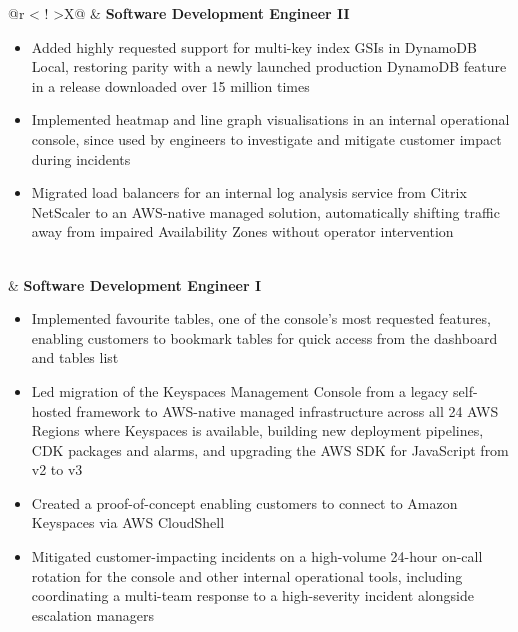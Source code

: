 

\begin{table}[H]
    \renewcommand\arraystretch{1.4}
    \begin{tabularx}{\textwidth}{@{}r <{\hskip -3pt} !{\foo} >{}X@{}}
        \addlinespace[1.5ex]
        & \textbf{Software Development Engineer II} \hfill {}
        \parbox{\textwidth}{}
        \begin{itemize}[topsep=5pt]
            \item Added highly requested support for multi-key index GSIs in DynamoDB Local, restoring parity with a newly launched production DynamoDB feature in a release downloaded over 15 million times
            \item Implemented heatmap and line graph visualisations in an internal operational console, since used by engineers to investigate and mitigate customer impact during incidents
            \item Migrated load balancers for an internal log analysis service from Citrix NetScaler to an AWS-native managed solution, automatically shifting traffic away from impaired Availability Zones without operator intervention
        \end{itemize} \\
        & \textbf{Software Development Engineer I} \hfill {}
        \parbox{\textwidth}{}
        \begin{itemize}[topsep=5pt]
            \item Implemented favourite tables, one of the console's most requested features, enabling customers to bookmark tables for quick access from the dashboard and tables list
            \item Led migration of the Keyspaces Management Console from a legacy self-hosted framework to AWS-native managed infrastructure across all 24 AWS Regions where Keyspaces is available, building new deployment pipelines, CDK packages and alarms, and upgrading the AWS SDK for JavaScript from v2 to v3
            \item Created a proof-of-concept enabling customers to connect to Amazon Keyspaces via AWS CloudShell
            \item Mitigated customer-impacting incidents on a high-volume 24-hour on-call rotation for the console and other internal operational tools, including coordinating a multi-team response to a high-severity incident alongside escalation managers

\end{itemize}
\end{tabularx}
\end{table}
